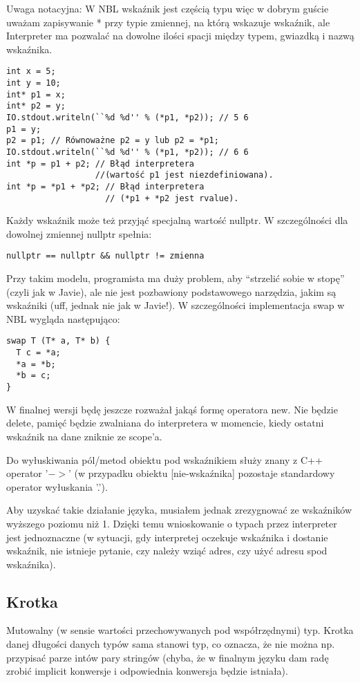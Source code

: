 \documentclass[a4paper,10pt]{scrartcl}
\begin{document}
Uwaga notacyjna: W NBL wskaźnik jest częścią typu więc w dobrym guście uważam zapisywanie * przy typie zmiennej, na którą wskazuje wskaźnik, ale
Interpreter ma pozwalać na dowolne ilości spacji między typem, gwiazdką i nazwą wskaźnika.

\begin{lstlisting}
int x = 5;
int y = 10;
int* p1 = x;
int* p2 = y;
IO.stdout.writeln(``%d %d'' % (*p1, *p2)); // 5 6
p1 = y;
p2 = p1; // Równoważne p2 = y lub p2 = *p1;
IO.stdout.writeln(``%d %d'' % (*p1, *p2)); // 6 6
int *p = p1 + p2; // Błąd interpretera 
                  //(wartość p1 jest niezdefiniowana).
int *p = *p1 + *p2; // Błąd interpretera 
                    // (*p1 + *p2 jest rvalue).
\end{lstlisting}

Każdy wskaźnik może też przyjąć specjalną wartość nullptr. W szczególności dla dowolnej zmiennej nullptr spełnia:
\begin{lstlisting}
nullptr == nullptr && nullptr != zmienna
\end{lstlisting}

Przy takim modelu, programista ma duży problem, aby ``strzelić sobie w stopę'' (czyli jak w Javie), ale nie jest pozbawiony podstawowego narzędzia,
jakim są wskaźniki (uff, jednak nie jak w Javie!). W szczególności implementacja swap w NBL wygląda następująco:
\begin{lstlisting}
swap T (T* a, T* b) {
  T c = *a;
  *a = *b;
  *b = c; 
}
\end{lstlisting}

W finalnej wersji będę jeszcze rozważał jakąś formę operatora new. Nie będzie delete, pamięć będzie zwalniana do interpretera w momencie, kiedy
ostatni wskaźnik na dane zniknie ze scope'a.

Do wyłuskiwania pól/metod obiektu pod wskaźnikiem służy znany z C++ operator '$->$' (w przypadku obiektu [nie-wskaźnika] pozostaje standardowy 
operator wyłuskania '.').

Aby uzyskać takie działanie języka, musiałem jednak zrezygnować ze wskaźników wyższego poziomu niż 1. Dzięki temu wnioskowanie o typach przez 
interpreter jest jednoznaczne (w sytuacji, gdy interpretej oczekuje wskaźnika i dostanie wskaźnik, nie istnieje pytanie, czy należy wziąć adres,
czy użyć adresu spod wskaźnika).

\subsection{Krotka}
Mutowalny (w sensie wartości przechowywanych pod współrzędnymi) typ. Krotka danej długości danych typów sama stanowi typ, co oznacza, że nie można
np. przypisać parze intów pary stringów (chyba, że w finalnym języku dam radę zrobić implicit konwersje i odpowiednia konwersja będzie istniała).
\end{document}

